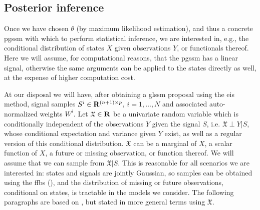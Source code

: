\subsection{Posterior inference}
\label{subsec:inference}
Once we have chosen $\theta$ (by maximum likelihood estimation), and thus a concrete \acrshort{pgssm} with which to perform statistical inference, we are interested in, e.g., the conditional distribution of states $X$ given observations $Y$, or functionals thereof. 
Here we will assume, for computational reasons, that the \acrshort{pgssm} has a linear signal, otherwise the same arguments can be applied to the states directly as well, at the expense of higher computation cost.

At our disposal we will have, after obtaining a \acrshort{glssm} proposal using the \acrshort{eis} method, signal samples $S^{i}\in \mathbf R^{(n+1)\times p}$, $i = 1, \dots, N$ and associated auto-normalized weights $W^{i}$. 
Let $\mathfrak X \in \mathbf R$ be a univariate random variable which is conditionally independent of the observations $Y$ given the signal $S$, i.e. $\mathfrak X \perp Y | S$, whose conditional expectation and variance given $Y$ exist, as well as a regular version of this conditional distribution. $\mathfrak X$ can be a marginal of $X$, a scalar function of $X$, a future or missing observation, or function thereof. We will assume that we can sample from $\mathfrak X | S$. This is reasonable for all scenarios we are interested in: states and signals are jointly Gaussian, so samples can be obtained using the \acrshort{ffbs} (), and the distribution of missing or future observations, conditional on states, is tractable in the models we consider. The following paragraphs are based on \citep[Section 11.5]{Durbin2012Time}, but stated in more general terms using $\mathfrak X$. 

